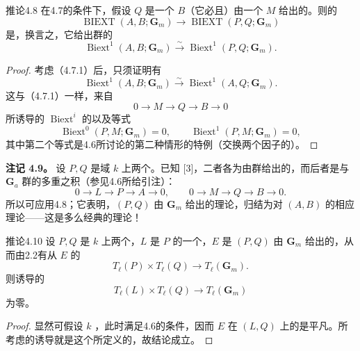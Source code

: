 \begin{SGAresult}{推论}{4.8}
在4.7的条件下，假设 $Q$ 是一个 $B$（它必且）由一个 $M$ 给出的。则的
\[\operatorname{BIEXT}(A,B;\mathbf G_m)\longrightarrow\operatorname{BIEXT}(P,Q;\mathbf G_m)\]
是，换言之，它给出群的
\[
\operatorname{Biext}^1(A,B;\mathbf G_m)\xrightarrow{\sim}\operatorname{Biext}^1(P,Q;\mathbf G_m).\tag{4.8.1}
\]
\end{SGAresult}
\begin{proof}
考虑（4.7.1）后，只须证明有
\[\operatorname{Biext}^1(A,B;\mathbf G_m)\xrightarrow{\sim}\operatorname{Biext}^1(A,Q;\mathbf G_m).\]
这与（4.7.1）一样，来自
\[0\longrightarrow M\longrightarrow Q\longrightarrow B\longrightarrow0\]
所诱导的 $\operatorname{Biext}^i$ 的以及等式
\[\operatorname{Biext}^0(P,M;\mathbf G_m)=0,\qquad\operatorname{Biext}^1(P,M;\mathbf G_m)=0,\]
其中第二个等式是4.6所讨论的第二种情形的特例（交换两个因子的）。
\end{proof}

\textbf{注记 4.9。} 设 $P,Q$ 是域 $k$ 上两个。已知 [3]，二者各为由群给出的，而后者是与 $\mathbf G_a$ 群的多重之积（参见4.6所给引注）：
\[
0\longrightarrow L\longrightarrow P\longrightarrow A\longrightarrow0,\qquad
0\longrightarrow M\longrightarrow Q\longrightarrow B\longrightarrow0.
\]
所以可应用4.8；它表明，$(P,Q)$ 由 $\mathbf G_m$ 给出的理论，归结为对 $(A,B)$ 的相应理论——这是多么经典的理论！

\begin{SGAresult}{推论}{4.10}
设 $P,Q$ 是 $k$ 上两个，$L$ 是 $P$ 的一个，$E$ 是 $(P,Q)$ 由 $\mathbf G_m$ 给出的，从而由2.2有从 $E$ 的
\[T_\ell(P)\times T_\ell(Q)\longrightarrow T_\ell(\mathbf G_m).\]
则诱导的
\[T_\ell(L)\times T_\ell(Q)\longrightarrow T_\ell(\mathbf G_m)\]
为零。
\end{SGAresult}
\begin{proof}
显然可假设 $k$ ，此时满足4.6的条件，因而 $E$ 在 $(L,Q)$ 上的是平凡。所考虑的诱导就是这个所定义的，故结论成立。
\end{proof}

